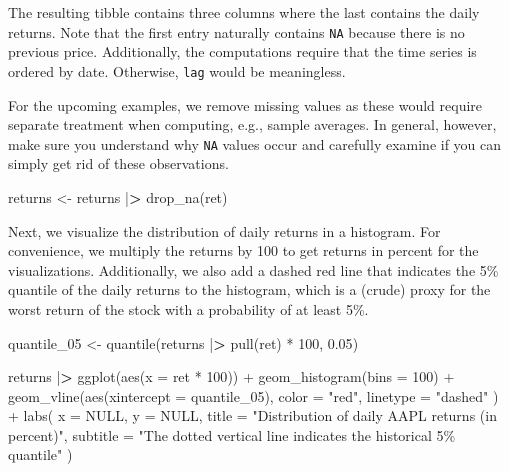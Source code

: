 \documentclass[
]{book}
\newenvironment{Shaded}{\begin{snugshade}}{\end{snugshade}}
\newcommand{\AttributeTok}[1]{\textcolor[rgb]{0.61,0.61,0.61}{#1}}
\newcommand{\ConstantTok}[1]{\textcolor[rgb]{0,0,0}{#1}}
\newcommand{\DecValTok}[1]{\textcolor[rgb]{0.06,0.06,0.06}{#1}}
\newcommand{\ErrorTok}[1]{\textcolor[rgb]{0.14,0.14,0.14}{\textbf{#1}}}
\newcommand{\FloatTok}[1]{\textcolor[rgb]{0.06,0.06,0.06}{#1}}
\newcommand{\FunctionTok}[1]{\textcolor[rgb]{0,0,0}{#1}}
\newcommand{\NormalTok}[1]{#1}
\newcommand{\OtherTok}[1]{\textcolor[rgb]{0.37,0.37,0.37}{#1}}
\newcommand{\SpecialCharTok}[1]{\textcolor[rgb]{0,0,0}{#1}}
\newcommand{\StringTok}[1]{\textcolor[rgb]{0.5,0.5,0.5}{#1}}
\begin{document}
The resulting tibble contains three columns where the last contains the daily returns. Note that the first entry naturally contains \texttt{NA} because there is no previous price. Additionally, the computations require that the time series is ordered by date.
Otherwise, \texttt{lag} would be meaningless.

For the upcoming examples, we remove missing values as these would require separate treatment when computing, e.g., sample averages. In general, however, make sure you understand why \texttt{NA} values occur and carefully examine if you can simply get rid of these observations.

\begin{Shaded}
\begin{Highlighting}[]
\NormalTok{returns }\OtherTok{\textless{}{-}}\NormalTok{ returns }\SpecialCharTok{|}\ErrorTok{\textgreater{}}
  \FunctionTok{drop\_na}\NormalTok{(ret)}
\end{Highlighting}
\end{Shaded}

Next, we visualize the distribution of daily returns in a histogram. For convenience, we multiply the returns by 100 to get returns in percent for the visualizations. Additionally, we also add a dashed red line that indicates the 5\% quantile of the daily returns to the histogram, which is a (crude) proxy for the worst return of the stock with a probability of at least 5\%.

\begin{Shaded}
\begin{Highlighting}[]
\NormalTok{quantile\_05 }\OtherTok{\textless{}{-}} \FunctionTok{quantile}\NormalTok{(returns }\SpecialCharTok{|}\ErrorTok{\textgreater{}} \FunctionTok{pull}\NormalTok{(ret) }\SpecialCharTok{*} \DecValTok{100}\NormalTok{, }\FloatTok{0.05}\NormalTok{)}

\NormalTok{returns }\SpecialCharTok{|}\ErrorTok{\textgreater{}}
  \FunctionTok{ggplot}\NormalTok{(}\FunctionTok{aes}\NormalTok{(}\AttributeTok{x =}\NormalTok{ ret }\SpecialCharTok{*} \DecValTok{100}\NormalTok{)) }\SpecialCharTok{+}
  \FunctionTok{geom\_histogram}\NormalTok{(}\AttributeTok{bins =} \DecValTok{100}\NormalTok{) }\SpecialCharTok{+}
  \FunctionTok{geom\_vline}\NormalTok{(}\FunctionTok{aes}\NormalTok{(}\AttributeTok{xintercept =}\NormalTok{ quantile\_05),}
    \AttributeTok{color =} \StringTok{"red"}\NormalTok{,}
    \AttributeTok{linetype =} \StringTok{"dashed"}
\NormalTok{  ) }\SpecialCharTok{+}
  \FunctionTok{labs}\NormalTok{(}
    \AttributeTok{x =} \ConstantTok{NULL}\NormalTok{,}
    \AttributeTok{y =} \ConstantTok{NULL}\NormalTok{,}
    \AttributeTok{title =} \StringTok{"Distribution of daily AAPL returns (in percent)"}\NormalTok{,}
    \AttributeTok{subtitle =} \StringTok{"The dotted vertical line indicates the historical 5\% quantile"}
\NormalTok{  )}
\end{Highlighting}
\end{Shaded}
\end{document}
